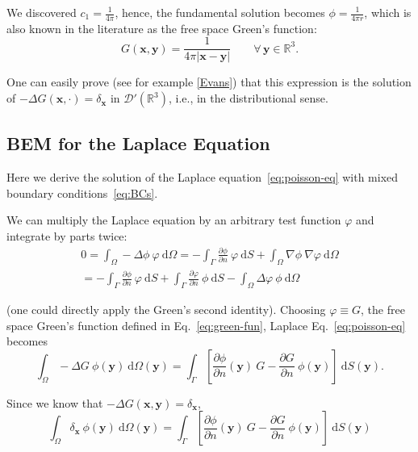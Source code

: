 We discovered $c_1=\frac{1}{4\pi}$, hence, the fundamental solution becomes $\phi=\frac{1}{4\pi r}$, which is also known in the literature as the free space Green's function:
\begin{equation}
\label{eq:green-fun}
G(\mathbf{x},\mathbf{y})=\frac{1}{4\pi \left| \mathbf{x}-\mathbf{y} \right|}\qquad \forall\,\mathbf{y}\in\mathbb{R}^3.
\end{equation}

One can easily prove (see for example \ref{Evans}) that this expression is the solution of $-\Delta G(\mathbf{x},\cdot)=\delta_\mathbf{x}$ in $\mathcal{D}'(\mathbb{R}^3)$, i.e., in the distributional sense. 

\subsection{BEM for the Laplace Equation}
\label{sub:bem_for_the_laplace_equation}

Here we derive the solution of the Laplace equation~\eqref{eq:poisson-eq} with mixed boundary conditions~\eqref{eq:BCs}. 

We can multiply the Laplace equation by an arbitrary test function $\varphi$ and integrate by parts twice:
\begin{gather*}
0=\int_\Omega -\Delta \phi\ \varphi \ \mathrm{d}\Omega = - \int_{\Gamma} \frac{\partial \phi}{\partial n}\ \varphi \ \mathrm{d}S + \int_\Omega \nabla \phi\ \nabla \varphi\ \mathrm{d}\Omega \\ 
= - \int_{\Gamma} \frac{\partial \phi}{\partial n}\ \varphi \ \mathrm{d}S + \int_{\Gamma} \frac{\partial \varphi}{\partial n}\ \phi \ \mathrm{d}S - \int_\Omega \Delta \varphi\ \phi\ \mathrm{d}\Omega
\end{gather*}

(one could directly apply the Green's second identity). Choosing $\varphi\equiv G$, the free space Green's function defined in Eq.~\eqref{eq:green-fun}, Laplace Eq.~\eqref{eq:poisson-eq} becomes
\begin{equation*}
\int_\Omega -\Delta G\ \phi(\mathbf{y})\ \mathrm{d}\Omega(\mathbf{y}) = \int_{\Gamma} \left[ \frac{\partial \phi}{\partial n}(\mathbf{y})\ G - \frac{\partial G}{\partial n}\ \phi(\mathbf{y}) \right]\!\! \ \mathrm{d}S(\mathbf{y}).
\end{equation*}

Since we know that $-\Delta G(\mathbf{x},\mathbf{y})=\delta_\mathbf{x}$,
\begin{equation*}
\int_\Omega \delta_\mathbf{x}\ \phi(\mathbf{y})\ \mathrm{d}\Omega(\mathbf{y}) = \int_{\Gamma} \left[ \frac{\partial \phi}{\partial n}(\mathbf{y})\ G- \frac{\partial G}{\partial n}\ \phi(\mathbf{y}) \right]\!\! \ \mathrm{d}S(\mathbf{y})
\end{equation*}

